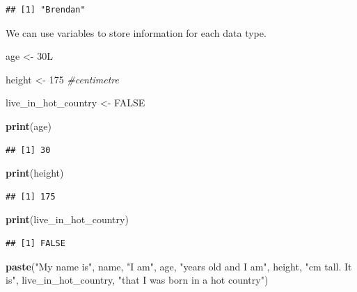 \documentclass[
]{book}
\newenvironment{Shaded}{\begin{snugshade}}{\end{snugshade}}
\newcommand{\CommentTok}[1]{\textcolor[rgb]{0.56,0.35,0.01}{\textit{#1}}}
\newcommand{\ConstantTok}[1]{\textcolor[rgb]{0.56,0.35,0.01}{#1}}
\newcommand{\DataTypeTok}[1]{\textcolor[rgb]{0.13,0.29,0.53}{#1}}
\newcommand{\DecValTok}[1]{\textcolor[rgb]{0.00,0.00,0.81}{#1}}
\newcommand{\FunctionTok}[1]{\textcolor[rgb]{0.13,0.29,0.53}{\textbf{#1}}}
\newcommand{\NormalTok}[1]{#1}
\newcommand{\OtherTok}[1]{\textcolor[rgb]{0.56,0.35,0.01}{#1}}
\newcommand{\StringTok}[1]{\textcolor[rgb]{0.31,0.60,0.02}{#1}}
\begin{document}
\begin{verbatim}
## [1] "Brendan"
\end{verbatim}

We can use variables to store information for each data type.

\begin{Shaded}
\begin{Highlighting}[]
\NormalTok{age }\OtherTok{\textless{}{-}} \DecValTok{30}\DataTypeTok{L}

\NormalTok{height }\OtherTok{\textless{}{-}} \DecValTok{175} \CommentTok{\#centimetre }

\NormalTok{live\_in\_hot\_country }\OtherTok{\textless{}{-}} \ConstantTok{FALSE}

\FunctionTok{print}\NormalTok{(age)}
\end{Highlighting}
\end{Shaded}

\begin{verbatim}
## [1] 30
\end{verbatim}

\begin{Shaded}
\begin{Highlighting}[]
\FunctionTok{print}\NormalTok{(height)}
\end{Highlighting}
\end{Shaded}

\begin{verbatim}
## [1] 175
\end{verbatim}

\begin{Shaded}
\begin{Highlighting}[]
\FunctionTok{print}\NormalTok{(live\_in\_hot\_country)}
\end{Highlighting}
\end{Shaded}

\begin{verbatim}
## [1] FALSE
\end{verbatim}

\begin{Shaded}
\begin{Highlighting}[]
\FunctionTok{paste}\NormalTok{(}\StringTok{"My name is"}\NormalTok{, name, }\StringTok{"I am"}\NormalTok{, age, }\StringTok{"years old and I am"}\NormalTok{, height, }\StringTok{"cm tall. It is"}\NormalTok{, live\_in\_hot\_country, }\StringTok{"that I was born in a hot country"}\NormalTok{)}
\end{Highlighting}
\end{Shaded}
\end{document}
